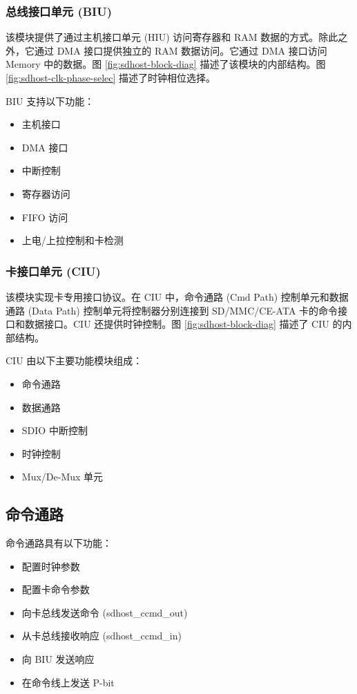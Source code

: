 \documentclass[main\_\_CN.tex]{subfiles}
\begin{document}
\subsubsection{总线接口单元 (BIU)}
该模块提供了通过主机接口单元 (HIU) 访问寄存器和 RAM 数据的方式。除此之外，它通过 DMA 接口提供独立的 RAM 数据访问。它通过 DMA 接口访问 Memory 中的数据。图 \ref{fig:sdhost-block-diag} 描述了该模块的内部结构。图 \ref{fig:sdhost-clk-phase-selec} 描述了时钟相位选择。

BIU 支持以下功能：

\begin{itemize}
	\item 主机接口
	\item DMA 接口
	\item 中断控制
	\item 寄存器访问
	\item FIFO 访问
	\item 上电/上拉控制和卡检测
\end{itemize}

\subsubsection{卡接口单元 (CIU)}
该模块实现卡专用接口协议。在 CIU 中，命令通路 (Cmd Path) 控制单元和数据通路 (Data Path) 控制单元将控制器分别连接到 SD/MMC/CE-ATA 卡的命令接口和数据接口。CIU 还提供时钟控制。图 \ref{fig:sdhost-block-diag} 描述了 CIU 的内部结构。

CIU 由以下主要功能模块组成：

\begin{itemize}
	\item 命令通路
	\item 数据通路
	\item SDIO 中断控制
	\item 时钟控制
	\item Mux/De-Mux 单元
\end{itemize}

\subsection{命令通路}

命令通路具有以下功能：
\begin{itemize}
	\item 配置时钟参数
	\item 配置卡命令参数
	\item 向卡总线发送命令 (sdhost\_ccmd\_out)
	\item 从卡总线接收响应 (sdhost\_ccmd\_in)
	\item 向 BIU 发送响应
	\item 在命令线上发送 P-bit
\end{itemize}
\end{document}
